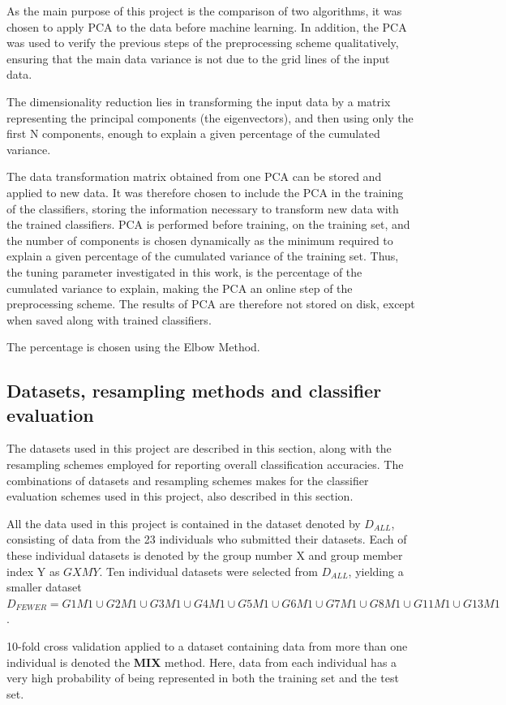 As the main purpose of this project is the comparison of two algorithms,
it was chosen to apply PCA to the data before machine learning.
In addition, the PCA was used to verify the previous
steps of the preprocessing scheme qualitatively,
ensuring that the main data variance is not due to the grid lines of the input data.

The dimensionality reduction lies in transforming the input
data by a matrix representing the principal components
(the eigenvectors), and then using only the
first N components, enough to explain a given percentage of the cumulated variance.

The data transformation matrix obtained from one PCA
can be stored and applied to new data.
It was therefore chosen to include the PCA in the training of the classifiers,
storing the information necessary to transform new data
with the trained classifiers.
PCA is performed before training, on the training set,
and the number of components is chosen dynamically as the minimum
required to explain a given percentage of the cumulated variance
of the training set.
Thus, the tuning parameter investigated in this work,
is the percentage of the cumulated variance to explain,
making the PCA an online step of the preprocessing scheme.
The results of PCA are therefore not stored on disk,
except when saved along with trained classifiers.

The percentage is chosen using the Elbow Method.

\subsection{Datasets, resampling methods and classifier evaluation}
The datasets used in this project are described in this section,
along with the resampling schemes employed for reporting
overall classification accuracies.
The combinations of datasets and resampling schemes makes
for the classifier evaluation schemes used in this project,
also described in this section.

All the data used in this project is contained in the dataset
denoted by \(D_{ALL}\), consisting of data from the 23
individuals who submitted their datasets.
Each of these individual datasets is denoted by the group number X
and group member index Y as \(GXMY\).
Ten individual datasets were selected from \(D_{ALL}\),
yielding a smaller dataset
\(D_{FEWER}=G1M1\cup G2M1\cup G3M1\cup G4M1\cup G5M1\cup G6M1\cup G7M1\cup G8M1\cup G11M1\cup G13M1\).

10-fold cross validation applied to a dataset containing data from more than
one individual is denoted the \textbf{MIX} method.
Here, data from each individual has a very high probability of
being represented in both the training set and the test set.

